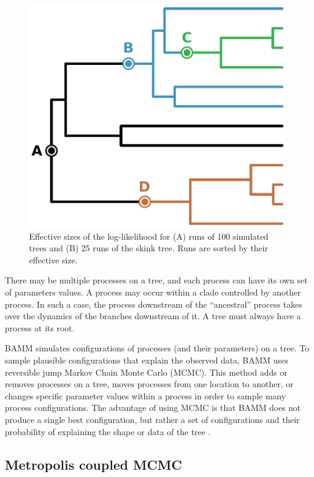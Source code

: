 \documentclass[12pt]{article}
\begin{document}
\begin{figure}
\begin{center}
\includegraphics[width=14cm]{tree.pdf}
\end{center}
\caption{Effective sizes of the log-likelihood for
    (A) runs of 100 simulated trees and (B) 25 runs of the skink tree.
    Runs are sorted by their effective size.}
\label{fig:tree}
\end{figure}


There may be multiple processes on a tree,
and each process can have its own set of parameters values.
%
A process may occur within a clade controlled by another process.
%
In such a case, the process downstream of the ``ancestral'' process
takes over the dynamics of the branches downstream of it.
%
A tree must always have a process at its root.


BAMM simulates configurations of processes (and their parameters) on a tree.
%
To sample plausible configurations that explain the observed data,
BAMM uses reversible jump Markov Chain Monte Carlo (MCMC).
%
This method adds or removes processes on a tree,
moves processes from one location to another,
or changes specific parameter values within a process
in order to sample many process configurations.
%
The advantage of using MCMC
is that BAMM does not produce a single best configuration,
but rather a set of configurations and their probability
of explaining the shape or data of the tree \citep{rab14plos}.


\subsection*{Metropolis coupled MCMC}
\end{document}

